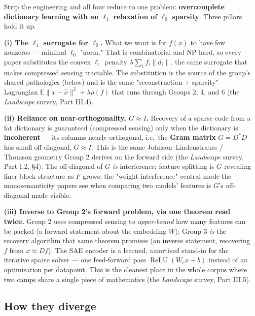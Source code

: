 Strip the engineering and all four reduce to one problem: \textbf{overcomplete dictionary learning with an $\ell_1$ relaxation of $\ell_0$ sparsity}. Three pillars hold it up.

\textbf{(i) The $\ell_1$ surrogate for $\ell_0$.} What we want is for $f(x)$ to have few nonzeros --- minimal $\ell_0$ "norm." That is combinatorial and NP-hard, so every paper substitutes the convex $\ell_1$ penalty $\lambda\sum_i f_i\lVert d_i\rVert$, the same surrogate that makes compressed sensing tractable. The substitution is the source of the group's shared pathologies (below) and is the same "reconstruction $+$ sparsity" Lagrangian $\mathbb{E}\lVert x-\hat x\rVert^2+\lambda\rho(f)$ that runs through Groups 2, 4, and 6 (the \emph{Landscape} survey, Part III.4).

\textbf{(ii) Reliance on near-orthogonality, $G\approx I$.} Recovery of a sparse code from a fat dictionary is guaranteed (compressed sensing) only when the dictionary is \textbf{incoherent} --- its columns nearly orthogonal, i.e.\ the \textbf{Gram matrix} $G=D^{*}D$ has small off-diagonal, $G\approx I$. This is the same Johnson--Lindenstrauss / Thomson geometry Group 2 derives on the forward side (the \emph{Landscape} survey, Part I.2, §4). The off-diagonal of $G$ \emph{is} interference; feature splitting is $G$ revealing finer block structure as $F$ grows; the "weight interference" central mode the monosemanticity papers see when comparing two models' features is $G$'s off-diagonal made visible.

\textbf{(iii) Inverse to Group 2's forward problem, via one theorem read twice.} Group 2 uses compressed sensing to \emph{upper-bound} how many features can be packed (a forward statement about the embedding $W$); Group 3 \emph{is} the recovery algorithm that same theorem promises (an inverse statement, recovering $f$ from $x\approx Df$). The SAE encoder is a learned, amortised stand-in for the iterative sparse solver --- one feed-forward pass $\operatorname{ReLU}(W_{e}x+b)$ instead of an optimisation per datapoint. This is the cleanest place in the whole corpus where two camps share a single piece of mathematics (the \emph{Landscape} survey, Part III.5).

\subsection*{How they diverge}

